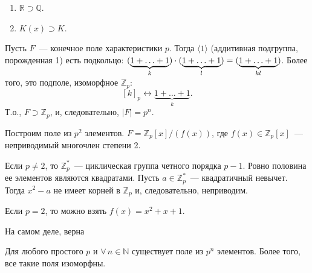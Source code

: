 \documentclass[a4paper]{article}
\newcommand*{\p}[1]{#1\nobreak\discretionary{}{\hbox{$\mathsurround=0pt #1$}}{}}
\begin{document}
\begin{ex}
\begin{enumerate}
  \item $\mathbb{R}\supset \mathbb{Q}$.
  \item $K(x)\supset K$.
\end{enumerate}
\end{ex}
Пусть $F$~--- конечное поле характеристики $p$. Тогда
$\langle1\rangle$ (аддитивная подгруппа, порожденная 1) есть
подкольцо:
$(\underbrace{1+\ldots+1}_{k})\cdot(\underbrace{1+\ldots+1}_{l})\p=(\underbrace{1+\ldots+1}_{kl})$.
Более того, это подполе, изоморфное $\mathbb{Z}_p$:
$$[k]_p\leftrightarrow \underbrace{1+\ldots+1}_{k}.$$ Т.о., $F\supset
\mathbb{Z}_p$, и, следовательно, $|F|=p^n$.

Построим поле из $p^2$ элементов. $F=\mathbb{Z}_p[x]/(f(x))$, где
$f(x)\in\mathbb{Z}_p[x]$~--- неприводимый многочлен степени 2.

Если $p\neq2$, то $\mathbb{Z}_p^*$~--- циклическая группа четного
порядка $p-1$. Ровно половина ее элементов являются квадратами.
Пусть $a\in \mathbb{Z}_p^*$~--- квадратичный невычет. Тогда $x^2-a$
не имеет корней в $\mathbb{Z}_p$ и, следовательно, неприводим.

Если $p=2$, то можно взять $f(x)=x^2+x+1$.

На самом деле, верна

\begin{theorem}
Для любого простого $p$ и $\forall \, n\in \mathbb{N}$ существует
поле из $p^n$ элементов. Более того, все такие поля изоморфны.
\end{theorem}
\end{document}

